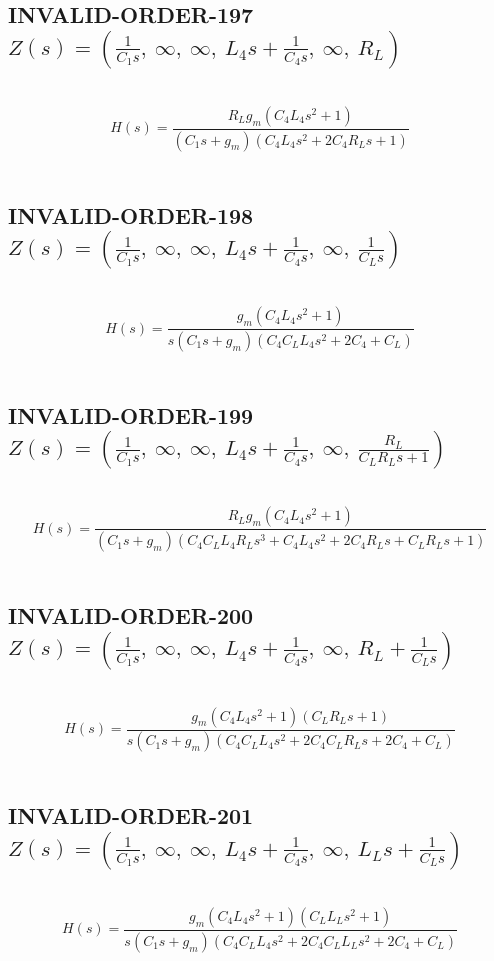 \documentclass{article}
\begin{document}
\subsection{INVALID-ORDER-197 $Z(s) = \left( \frac{1}{C_{1} s}, \  \infty, \  \infty, \  L_{4} s + \frac{1}{C_{4} s}, \  \infty, \  R_{L}\right)$ } \ 
\textbf{\[H(s) = \frac{R_{L} g_{m} \left(C_{4} L_{4} s^{2} + 1\right)}{\left(C_{1} s + g_{m}\right) \left(C_{4} L_{4} s^{2} + 2 C_{4} R_{L} s + 1\right)}\] } \ 
\subsection{INVALID-ORDER-198 $Z(s) = \left( \frac{1}{C_{1} s}, \  \infty, \  \infty, \  L_{4} s + \frac{1}{C_{4} s}, \  \infty, \  \frac{1}{C_{L} s}\right)$ } \ 
\textbf{\[H(s) = \frac{g_{m} \left(C_{4} L_{4} s^{2} + 1\right)}{s \left(C_{1} s + g_{m}\right) \left(C_{4} C_{L} L_{4} s^{2} + 2 C_{4} + C_{L}\right)}\] } \ 
\subsection{INVALID-ORDER-199 $Z(s) = \left( \frac{1}{C_{1} s}, \  \infty, \  \infty, \  L_{4} s + \frac{1}{C_{4} s}, \  \infty, \  \frac{R_{L}}{C_{L} R_{L} s + 1}\right)$ } \ 
\textbf{\[H(s) = \frac{R_{L} g_{m} \left(C_{4} L_{4} s^{2} + 1\right)}{\left(C_{1} s + g_{m}\right) \left(C_{4} C_{L} L_{4} R_{L} s^{3} + C_{4} L_{4} s^{2} + 2 C_{4} R_{L} s + C_{L} R_{L} s + 1\right)}\] } \ 
\subsection{INVALID-ORDER-200 $Z(s) = \left( \frac{1}{C_{1} s}, \  \infty, \  \infty, \  L_{4} s + \frac{1}{C_{4} s}, \  \infty, \  R_{L} + \frac{1}{C_{L} s}\right)$ } \ 
\textbf{\[H(s) = \frac{g_{m} \left(C_{4} L_{4} s^{2} + 1\right) \left(C_{L} R_{L} s + 1\right)}{s \left(C_{1} s + g_{m}\right) \left(C_{4} C_{L} L_{4} s^{2} + 2 C_{4} C_{L} R_{L} s + 2 C_{4} + C_{L}\right)}\] } \ 
\subsection{INVALID-ORDER-201 $Z(s) = \left( \frac{1}{C_{1} s}, \  \infty, \  \infty, \  L_{4} s + \frac{1}{C_{4} s}, \  \infty, \  L_{L} s + \frac{1}{C_{L} s}\right)$ } \ 
\textbf{\[H(s) = \frac{g_{m} \left(C_{4} L_{4} s^{2} + 1\right) \left(C_{L} L_{L} s^{2} + 1\right)}{s \left(C_{1} s + g_{m}\right) \left(C_{4} C_{L} L_{4} s^{2} + 2 C_{4} C_{L} L_{L} s^{2} + 2 C_{4} + C_{L}\right)}\] } \ 
\end{document}

